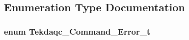 \subsection{Enumeration Type Documentation}
\hypertarget{group__tekdaqc__error_ga91c51567356a5f53b2d62610fa1bf397}{
\subsubsection[{Tekdaqc\-\_\-\-Command\-\_\-\-Error\-\_\-t}]{\setlength{\rightskip}{0pt plus 5cm}enum {\bf Tekdaqc\-\_\-\-Command\-\_\-\-Error\-\_\-t}}}\label{group__tekdaqc__error_ga91c51567356a5f53b2d62610fa1bf397}
